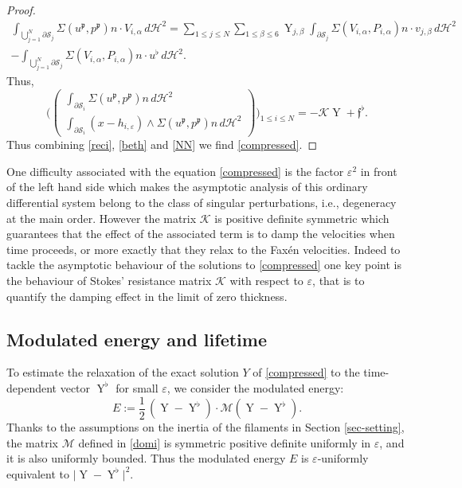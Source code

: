 \documentclass[11pt]{article}
\let\oldbigcup\bigcup
\newcommand{\ie}{i.e.,\xspace}
\let\eps\varepsilon
\DeclareMathOperator{\Y}{Y}
\theoremstyle{definition}
\theoremstyle{remark}
\begin{document}
\begin{proof}
\begin{multline*}
\int_{\oldbigcup_{j=1}^N \partial \mathcal S_j }
\Sigma(u^\mathfrak{p}, p^\mathfrak{p}) n \cdot V_{i,\alpha} \, d\mathcal{H}^2=
\sum_{1 \leq j \leq N} \sum_{1\leq \beta \leq 6} \Y_{j,\beta } \int_{\partial \mathcal S_j }
\Sigma(V_{i,\alpha}, P_{i,\alpha}) n \cdot v_{j,\beta} \, d\mathcal{H}^2
\\ 
-\int_{\oldbigcup_{j=1}^N \partial \mathcal S_j } \Sigma(V_{i,\alpha}, P_{i,\alpha}) n \cdot u^\flat \, d\mathcal{H}^2.
\end{multline*}
Thus,
\begin{equation}
\label{reci}
\biggl(\begin{pmatrix}
\int_{\partial \mathcal S_i } \Sigma(u^\mathfrak{p}, p^\mathfrak{p}) n \, d\mathcal{H}^2 \\
\int_{\partial \mathcal S_i} (x - h_{i,\eps}) \wedge \Sigma(u^\mathfrak{p}, p^\mathfrak{p}) n \, d\mathcal{H}^2
\end{pmatrix}\biggr)_{1 \leq i \leq N}
=
- \mathcal K \Y
+ \mathfrak{f}^\flat.
\end{equation}
Thus combining \eqref{reci}, \eqref{beth} and \eqref{NN}
we find \eqref{compressed}.
\end{proof}

One difficulty associated with the equation \eqref{compressed}
is the factor $\eps^2$ in front of the left hand side which makes the asymptotic analysis of this ordinary differential system belong to the class of singular perturbations, \ie degeneracy at the main order.
However the matrix $\mathcal K$ is positive definite symmetric which guarantees that the effect of the associated term is to damp the velocities when time proceeds, or more exactly that they relax to the Faxén velocities.
Indeed to tackle the asymptotic behaviour of the solutions to \eqref{compressed}
one key point is the behaviour of Stokes' resistance matrix $\mathcal K$ with respect to $\eps$, that is to quantify the damping effect in the limit of zero thickness.

\subsection{Modulated energy and lifetime}
\label{section-modu}

To estimate the relaxation of the exact solution $Y$ of \eqref{compressed}
to the time-dependent vector $\Y^\flat$
for small $\eps$, we consider the modulated energy:
\begin{equation}
E := \frac 1 2\, (\Y - \Y^\flat) \cdot \mathcal{M} (\Y - \Y^\flat).
\end{equation}
Thanks to the assumptions on the inertia of the filaments in
Section
\ref{sec-setting}, the matrix $\mathcal{M}$ defined in \eqref{domi} is symmetric positive definite uniformly in $\eps$, and it is also
uniformly bounded. Thus the modulated energy $E$ is $\eps$-uniformly equivalent to $\vert \Y - \Y^\flat \vert^2$.
\end{document}
